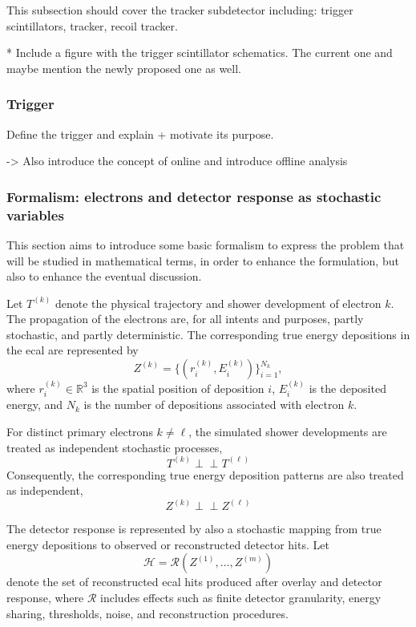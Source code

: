 This subsection should cover the tracker subdetector including: trigger scintillators, tracker, recoil tracker. 

* Include a figure with the trigger scintillator schematics. The current one and maybe mention the newly proposed one as well. 

\subsubsection{Trigger}

Define the trigger and explain + motivate its purpose. 

-> Also introduce the concept of online and introduce offline analysis

\subsubsection{Formalism: electrons and detector response as stochastic variables}
\label{sec:formalism}


This section aims to introduce some basic formalism to express the problem that will be studied in mathematical terms, in order to enhance the formulation, but also to enhance the eventual discussion. 

Let \(T^{(k)}\) denote the physical trajectory and shower development of electron \(k\). The propagation of the electrons are, for all intents and purposes, partly stochastic, and partly deterministic. 
The corresponding true energy depositions in the \gls{ecal} are represented by
\[
Z^{(k)} = \{(r^{(k)}_i, E^{(k)}_i)\}_{i=1}^{N_k},
\]
where \(r^{(k)}_i \in \mathbb{R}^3\) is the spatial position of deposition \(i\), 
\(E^{(k)}_i\) is the deposited energy, and \(N_k\) is the number of depositions associated with electron \(k\).

For distinct primary electrons \(k \neq \ell\), the simulated shower developments are treated as independent stochastic processes,
\[
T^{(k)} \perp\!\!\!\perp T^{(\ell)}
\]
Consequently, the corresponding true energy deposition patterns are also treated as independent,
\[
Z^{(k)} \perp\!\!\!\perp Z^{(\ell)}
\]

The detector response is represented by also a stochastic mapping from true energy depositions to observed or reconstructed detector hits. 
Let
\[
\mathcal{H} = \mathcal{R}\!\left(Z^{(1)},\ldots,Z^{(m)}\right)
\]
denote the set of reconstructed \gls{ecal} hits produced after overlay and detector response, where \(\mathcal{R}\) includes effects such as finite detector granularity, energy sharing, thresholds, noise, and reconstruction procedures.

